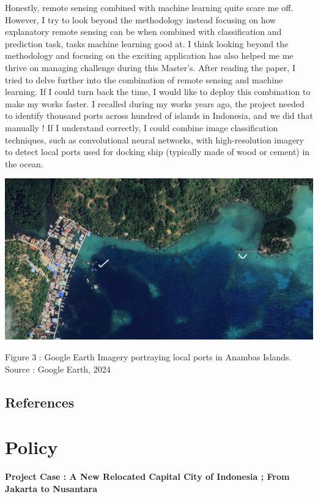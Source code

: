 \documentclass[
  letterpaper,
  DIV=11,
  numbers=noendperiod]{scrreprt}
\begin{document}
Honestly, remote sensing combined with machine learning quite scare me
off. However, I try to look beyond the methodology instead focusing on
how explanatory remote sensing can be when combined with classification
and prediction task, tasks machine learning good at. I think looking
beyond the methodology and focusing on the exciting application has also
helped me me thrive on managing challenge during this Master's. After
reading the paper, I tried to delve further into the combination of
remote sensing and machine learning. If I could turn back the time, I
would like to deploy this combination to make my works faster. I
recalled during my works years ago, the project needed to identify
thousand ports across hundred of islands in Indonesia, and we did that
manually ! If I understand correctly, I could combine image
classification techniques, such as convolutional neural networks, with
high-resolution imagery to detect local ports used for docking ship
(typically made of wood or cement) in the ocean.

\includegraphics{images/clipboard-2420843413.png}

Figure 3 : Google Earth Imagery portraying local ports in Anambas
Islands. Source : Google Earth, 2024

\hypertarget{references-1}{%
\section{References}\label{references-1}}


\hypertarget{policy}{%
\chapter{Policy}\label{policy}}

\textbf{Project Case : A New Relocated Capital City of Indonesia ; From
Jakarta to Nusantara}
\end{document}
